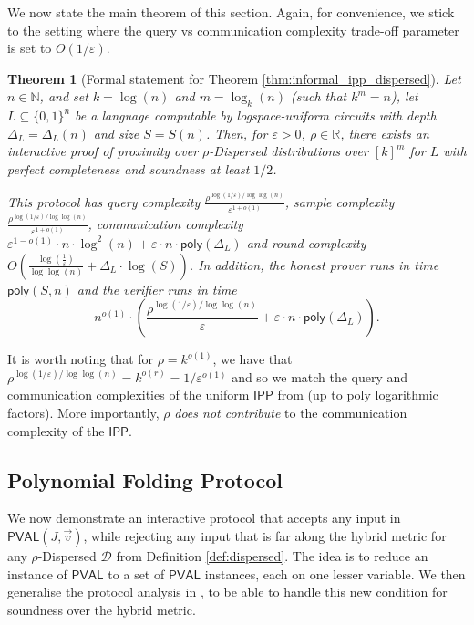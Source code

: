 \documentclass[11pt]{article}
\newtheorem{theorem}{Theorem}[section]
\newcommand{\poly}{\mathsf{poly}}
\newcommand{\PVAL}{\mathsf{PVAL}}
\newcommand{\IPP}{\mathsf{IPP}}
\newcommand{\N}{\mathbb{N}}
\newcommand{\sD}{\mathcal{D}}
\newcommand{\eps}{\varepsilon}
\begin{document}
\noindent We now state the main theorem of this section. Again, for convenience, we stick to the setting where the query vs communication complexity trade-off parameter is set to $O(1/\eps)$. 
\begin{theorem}[Formal statement for Theorem \ref{thm:informal_ipp_dispersed}]
\label{thm:dispersed_ipp_nc}
Let $n\in \N$, and set $k=\log (n)$ and $m=\log_{k}(n)$ (such that $k^m=n$), let $L \subseteq \{0,1\}^{n}$ be a language computable by logspace-uniform  circuits with depth $\Delta_{L}=\Delta_{L}(n)$ and size $S=S(n)$. Then, for $\varepsilon > 0$, $\rho\in \mathbb{R}$, there exists an interactive proof of proximity over $\rho$-Dispersed distributions over $[k]^{m}$ for $L$ with perfect completeness and soundness at least $1/2$.

This protocol has query complexity $\frac{\rho^{\log (1/\varepsilon)/\log\log (n)}}{\varepsilon ^{1+o(1)}}$, sample complexity $\frac{\rho^{\log (1/\varepsilon)/\log\log (n)}}{\varepsilon ^{1+o(1)}}$, communication complexity $
\varepsilon^{1-o(1)}\cdot  n\cdot \log^{2}(n)+\varepsilon\cdot n\cdot \poly(\Delta_{L})$ and round complexity $O\left(\frac{\log\left(\frac{1}{\varepsilon}\right)}{\log\log (n)}+\Delta_{L}\cdot\log (S)\right)$. In addition, the honest prover runs in time $\poly(S,n)$ and the verifier runs in time
\[n^{o(1)} \cdot \left( \frac{\rho^{\log (1/\varepsilon)/\log\log (n)}}{\varepsilon}+\varepsilon\cdot n\cdot\poly(\Delta_{L}) \right).
\]
\end{theorem}

It is worth noting that for $\rho=k^{o(1)}$, we have that $\rho^{\log (1/\varepsilon)/\log\log (n)}=k^{o(r)}=1/\varepsilon^{o(1)}$ and so we match the query and communication complexities of the uniform $\IPP$ from \cite{RVW} (up to poly logarithmic factors). More importantly, $\rho$ \textit{does not contribute} to the communication complexity of the $\IPP$.



\subsection{Polynomial Folding Protocol}\label{POLYFOLD}
We now demonstrate an interactive protocol that accepts any input in $\PVAL(J,\Vec{v})$, while rejecting any input that is far along the hybrid metric for any $\rho$-Dispersed $\sD$ from Definition \ref{def:dispersed}. The idea is to reduce an instance of $\PVAL$ to a set of $\PVAL$ instances, each on one lesser variable. We then generalise the protocol analysis in \cite{RVW}, to be able to handle this new condition for soundness over the hybrid metric. 
\end{document}
